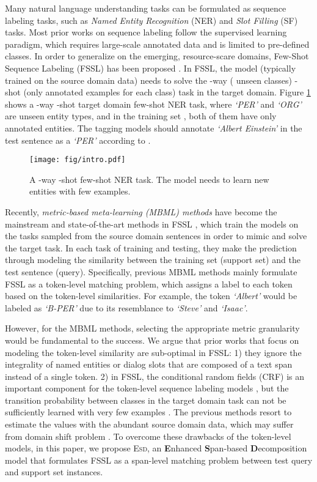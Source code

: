 \documentclass[11pt]{article}
\newcommand{\modelname}{\textsc{Esd}\xspace}
\begin{document}
Many natural language understanding tasks can be formulated as sequence labeling tasks,
such as \textit{Named Entity Recognition} (NER) and \textit{Slot Filling} (SF) tasks.
Most prior works on sequence labeling follow the supervised learning paradigm, which requires large-scale annotated data and is limited to pre-defined classes.
In order to generalize on the emerging, resource-scare domains, Few-Shot Sequence Labeling (FSSL) has been proposed \cite{fewshothou, NNshot}.
In FSSL, the model (typically trained on the source domain data) needs to solve the -way ( unseen classes) -shot (only  annotated examples for each class) task in the target domain.
Figure \ref{fig:intro} shows a -way -shot target domain few-shot NER task,
where \textit{`PER' }and \textit{`ORG'} are  unseen entity types, and in the training set , both of them have only  annotated entities.
The tagging models should annotate \textit{`Albert Einstein'} in the test sentence  as a \textit{`PER'} according to .
\begin{figure}[t]
    \centering
    \texttt{[image: fig/intro.pdf]}
    \caption{
    A -way -shot few-shot NER task. The model needs to learn new entities with few examples.}
    \label{fig:intro}
\end{figure}    

Recently, \textit{metric-based meta-learning (MBML) methods} have become the mainstream and state-of-the-art methods in FSSL \cite{fewshothou,FewNERD}, which train the models on the tasks sampled from the source domain sentences in order to mimic and solve the target task.
In each task of training and testing, they make the prediction through modeling the similarity between the training set (support set) and the test sentence (query).
Specifically, previous MBML methods \cite{FewNERD, fewshothou, NNshot} mainly formulate FSSL as a token-level matching problem, which assigns a label to each token based on the token-level similarities. For example, the token \textit{`Albert'} would be labeled as \textit{`B-PER'} due to its resemblance to \textit{`Steve'} and \textit{`Isaac'}.

However, for the MBML methods, 
selecting the appropriate metric granularity would be fundamental to the success.
We argue that prior works that focus on modeling the token-level similarity are sub-optimal in FSSL:
1) they ignore the integrality of named entities or dialog slots that are composed of a text span instead of a single token.
2) in FSSL, the conditional random fields (CRF) is an important component for the token-level sequence labeling models \cite{NNshot, fewshothou}, but the transition probability between classes in the target domain task can not be sufficiently learned with very few examples \cite{span-naacl}. The previous methods resort to estimate the values with the abundant source domain data, which may suffer from domain shift problem \cite{fewshothou}.
To overcome these drawbacks of the token-level models,
in this paper, we propose \modelname, an \textbf{E}nhanced \textbf{S}pan-based \textbf{D}ecomposition model that formulates FSSL as a span-level matching problem between test query and support set instances.
\end{document}
